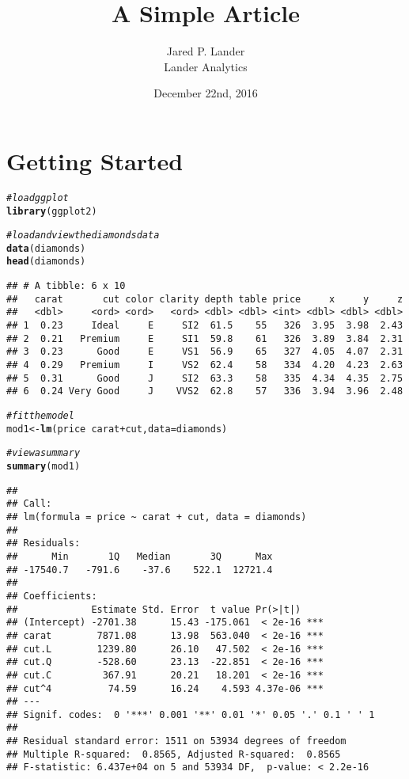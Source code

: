 \documentclass{article}\usepackage[]{graphicx}\usepackage[]{color}
\title{A Simple Article}
\author{Jared P. Lander\\ Lander Analytics}
\date{December 22nd, 2016}
\makeatletter
\newcommand{\hlcom}[1]{\textcolor[rgb]{0.678,0.584,0.686}{\textit{#1}}}%
\newcommand{\hlopt}[1]{\textcolor[rgb]{0,0,0}{#1}}%
\newcommand{\hlstd}[1]{\textcolor[rgb]{0.345,0.345,0.345}{#1}}%
\newcommand{\hlkwb}[1]{\textcolor[rgb]{0.69,0.353,0.396}{#1}}%
\newcommand{\hlkwc}[1]{\textcolor[rgb]{0.333,0.667,0.333}{#1}}%
\newcommand{\hlkwd}[1]{\textcolor[rgb]{0.737,0.353,0.396}{\textbf{#1}}}%
\newenvironment{kframe}{%
 \def\at@end@of@kframe{}%
 \ifinner\ifhmode%
  \def\at@end@of@kframe{\end{minipage}}%
  \begin{minipage}{\columnwidth}%
 \fi\fi%
 \def\FrameCommand##1{\hskip\@totalleftmargin \hskip-\fboxsep
 \colorbox{shadecolor}{##1}\hskip-\fboxsep
     \hskip-\linewidth \hskip-\@totalleftmargin \hskip\columnwidth}%
 \MakeFramed {\advance\hsize-\width
   \@totalleftmargin\z@ \linewidth\hsize
   \@setminipage}}%
 {\par\unskip\endMakeFramed%
 \at@end@of@kframe}
\newenvironment{knitrout}{}{} %
\makeatother
\begin{document}
\maketitle
\tableofcontents
\section{Getting Started}
\label{sec:GettingStarted}


\begin{knitrout}
\color{fgcolor}\begin{kframe}
\begin{alltt}
\hlcom{# load ggplot}
\hlkwd{library}\hlstd{(ggplot2)}

\hlcom{# load and view the diamonds data}
\hlkwd{data}\hlstd{(diamonds)}
\hlkwd{head}\hlstd{(diamonds)}
\end{alltt}
\begin{verbatim}
## # A tibble: 6 x 10
##   carat       cut color clarity depth table price     x     y     z
##   <dbl>     <ord> <ord>   <ord> <dbl> <dbl> <int> <dbl> <dbl> <dbl>
## 1  0.23     Ideal     E     SI2  61.5    55   326  3.95  3.98  2.43
## 2  0.21   Premium     E     SI1  59.8    61   326  3.89  3.84  2.31
## 3  0.23      Good     E     VS1  56.9    65   327  4.05  4.07  2.31
## 4  0.29   Premium     I     VS2  62.4    58   334  4.20  4.23  2.63
## 5  0.31      Good     J     SI2  63.3    58   335  4.34  4.35  2.75
## 6  0.24 Very Good     J    VVS2  62.8    57   336  3.94  3.96  2.48
\end{verbatim}
\begin{alltt}
\hlcom{# fit the model}
\hlstd{mod1} \hlkwb{<-} \hlkwd{lm}\hlstd{(price} \hlopt{~} \hlstd{carat} \hlopt{+} \hlstd{cut,} \hlkwc{data}\hlstd{=diamonds)}

\hlcom{# view a summary}
\hlkwd{summary}\hlstd{(mod1)}
\end{alltt}
\begin{verbatim}
## 
## Call:
## lm(formula = price ~ carat + cut, data = diamonds)
## 
## Residuals:
##      Min       1Q   Median       3Q      Max 
## -17540.7   -791.6    -37.6    522.1  12721.4 
## 
## Coefficients:
##             Estimate Std. Error  t value Pr(>|t|)    
## (Intercept) -2701.38      15.43 -175.061  < 2e-16 ***
## carat        7871.08      13.98  563.040  < 2e-16 ***
## cut.L        1239.80      26.10   47.502  < 2e-16 ***
## cut.Q        -528.60      23.13  -22.851  < 2e-16 ***
## cut.C         367.91      20.21   18.201  < 2e-16 ***
## cut^4          74.59      16.24    4.593 4.37e-06 ***
## ---
## Signif. codes:  0 '***' 0.001 '**' 0.01 '*' 0.05 '.' 0.1 ' ' 1
## 
## Residual standard error: 1511 on 53934 degrees of freedom
## Multiple R-squared:  0.8565,	Adjusted R-squared:  0.8565 
## F-statistic: 6.437e+04 on 5 and 53934 DF,  p-value: < 2.2e-16
\end{verbatim}
\end{kframe}
\end{knitrout}
\end{document}

